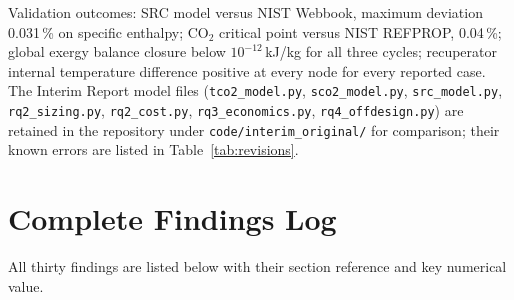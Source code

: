 Validation outcomes: SRC model versus NIST Webbook, maximum deviation
0.031\,\% on specific enthalpy; CO$_2$ critical point versus NIST REFPROP,
0.04\,\%; global exergy balance closure below $10^{-12}$\,kJ/kg for all
three cycles; recuperator internal temperature difference positive at every
node for every reported case. The Interim Report model files
(\texttt{tco2\_model.py}, \texttt{sco2\_model.py}, \texttt{src\_model.py},
\texttt{rq2\_sizing.py}, \texttt{rq2\_cost.py}, \texttt{rq3\_economics.py},
\texttt{rq4\_offdesign.py}) are retained in the repository under
\texttt{code/interim\_original/} for comparison; their known errors are
listed in Table~\ref{tab:revisions}.

\chapter{Complete Findings Log}
\label{app:findings}

All thirty findings are listed below with their section reference and key
numerical value.

